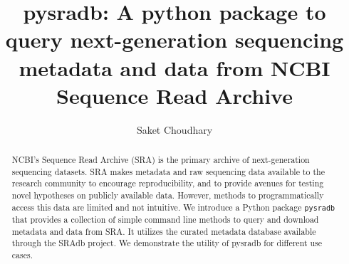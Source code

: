 \documentclass[9pt,a4paper]{extarticle}
\begin{document}
\pagestyle{front}
\title{pysradb: A python package to query next-generation sequencing metadata
and data from NCBI Sequence Read Archive}

\author[]{Saket Choudhary}


\maketitle
\thispagestyle{front}


\begin{abstract}





NCBI’s Sequence Read Archive (SRA) is the primary archive of next-generation 
sequencing datasets. SRA makes metadata and raw sequencing data available to the
research community to encourage reproducibility, and to provide avenues for 
testing novel hypotheses on publicly available data. However, methods to
programmatically access this data are limited and not intuitive. We introduce a
Python package \texttt{pysradb} that provides a collection of simple command
line methods to query and download metadata and data from SRA. It utilizes the
curated metadata database available through the SRAdb project. We demonstrate 
the utility of pysradb for different use cases. 


\end{abstract}
\end{document}
